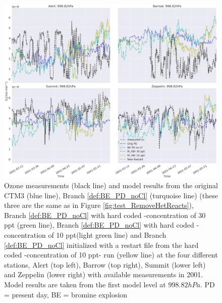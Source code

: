 \begin{figure}[ht]
    \centering
    \includegraphics[width=\linewidth]{Chapter6_Results/images/ozone_noCl_step2.png}
    \caption{Ozone measurements (black line) and model results from the original CTM3 (blue line), Branch \ref{def:BE_PD_noCl} (turquoise line) (these three are the same as in Figure \ref{fig:test_RemoveHetReacts}), Branch \ref{def:BE_PD_noCl} with hard coded -concentration of 30 ppt (green line), Branch \ref{def:BE_PD_noCl} with hard coded -concentration of 10 ppt(light green line) and Branch \ref{def:BE_PD_noCl} initialized with a restart file from the hard coded -concentration of 10 ppt- run (yellow line) at the four different stations, Alert (top left), Barrow (top right), Summit (lower left) and Zeppelin (lower right) with available measurements in 2001. Model results are taken from the first model level at $998.82 hPa$. PD = present day, BE = bromine explosion}
    \label{fig:ozone_noCl_step2}
\end{figure}